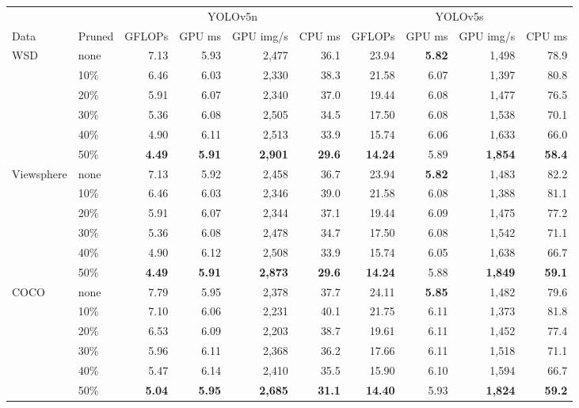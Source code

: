 \begin{tabular}{llrrrrrrrr}
\toprule
 & & \multicolumn{4}{c}{YOLOv5n} & \multicolumn{4}{c}{YOLOv5s} \\
\cmidrule(lr){3-6}\cmidrule(lr){7-10}
Data & Pruned & GFLOPs & GPU ms & GPU img/s & CPU ms & GFLOPs & GPU ms & GPU img/s & CPU ms \\
\midrule
WSD & none & 7.13 & 5.93 & 2,477 & 36.1 & 23.94 & \textbf{5.82} & 1,498 & 78.9 \\
 & 10\% & 6.46 & 6.03 & 2,330 & 38.3 & 21.58 & 6.07 & 1,397 & 80.8 \\
 & 20\% & 5.91 & 6.07 & 2,340 & 37.0 & 19.44 & 6.08 & 1,477 & 76.5 \\
 & 30\% & 5.36 & 6.08 & 2,505 & 34.5 & 17.50 & 6.08 & 1,538 & 70.1 \\
 & 40\% & 4.90 & 6.11 & 2,513 & 33.9 & 15.74 & 6.06 & 1,633 & 66.0 \\
 & 50\% & \textbf{4.49} & \textbf{5.91} & \textbf{2,901} & \textbf{29.6} & \textbf{14.24} & 5.89 & \textbf{1,854} & \textbf{58.4} \\
\midrule
Viewsphere & none & 7.13 & 5.92 & 2,458 & 36.7 & 23.94 & \textbf{5.82} & 1,483 & 82.2 \\
 & 10\% & 6.46 & 6.03 & 2,346 & 39.0 & 21.58 & 6.08 & 1,388 & 81.1 \\
 & 20\% & 5.91 & 6.07 & 2,344 & 37.1 & 19.44 & 6.09 & 1,475 & 77.2 \\
 & 30\% & 5.36 & 6.08 & 2,478 & 34.7 & 17.50 & 6.08 & 1,542 & 71.1 \\
 & 40\% & 4.90 & 6.12 & 2,508 & 33.9 & 15.74 & 6.05 & 1,638 & 66.7 \\
 & 50\% & \textbf{4.49} & \textbf{5.91} & \textbf{2,873} & \textbf{29.6} & \textbf{14.24} & 5.88 & \textbf{1,849} & \textbf{59.1} \\
\midrule
COCO & none & 7.79 & 5.95 & 2,378 & 37.7 & 24.11 & \textbf{5.85} & 1,482 & 79.6 \\
 & 10\% & 7.10 & 6.06 & 2,231 & 40.1 & 21.75 & 6.11 & 1,373 & 81.8 \\
 & 20\% & 6.53 & 6.09 & 2,203 & 38.7 & 19.61 & 6.11 & 1,452 & 77.4 \\
 & 30\% & 5.96 & 6.11 & 2,368 & 36.2 & 17.66 & 6.11 & 1,518 & 71.1 \\
 & 40\% & 5.47 & 6.14 & 2,410 & 35.5 & 15.90 & 6.10 & 1,594 & 66.7 \\
 & 50\% & \textbf{5.04} & \textbf{5.95} & \textbf{2,685} & \textbf{31.1} & \textbf{14.40} & 5.93 & \textbf{1,824} & \textbf{59.2} \\
\bottomrule
\end{tabular}
